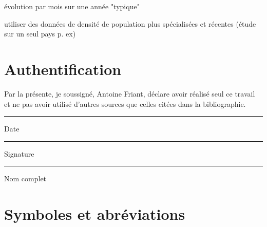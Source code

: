 \documentclass[a4paper, 11pt]{report}
\begin{document}
évolution par mois sur une année "typique"

utiliser des données de densité de population plus spécialisées et récentes (étude sur un seul pays p. ex)

\printbibliography

\chapter{Authentification}
Par la présente, je soussigné, Antoine Friant, déclare avoir réalisé seul ce travail et ne pas avoir utilisé d'autres sources que celles citées dans la bibliographie.


\vspace*{5cm}


\begin{multicols}{2}
	
	\noindent\rule[0.5ex]{\linewidth}{1pt}
	Date
	
	\columnbreak
	
	\noindent\rule[0.5ex]{\linewidth}{1pt}
	Signature
	
	\vspace*{2cm}
	
	\noindent\rule[0.5ex]{\linewidth}{1pt}
	Nom complet
\end{multicols}

\chapter{Symboles et abréviations}

\listoffigures

\end{document}
